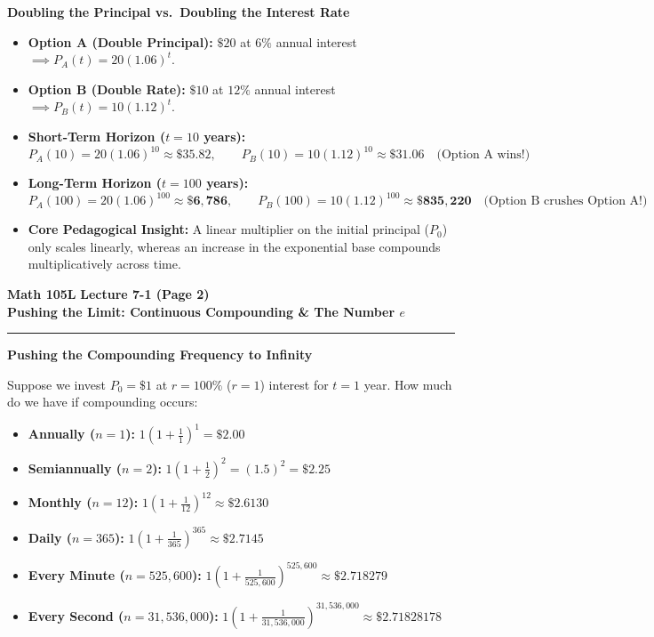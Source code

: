 \documentclass[10.5pt]{article}
\begin{document}
\vspace{0.02in}

\textbf{\large Doubling the Principal vs.\ Doubling the Interest Rate}

\begin{itemize}[leftmargin=1.2em, topsep=1pt, itemsep=2pt]
  \item \textbf{Option A (Double Principal):} $\$20$ at $6\%$ annual interest $\implies P_A(t) = 20(1.06)^t$.
  \item \textbf{Option B (Double Rate):} $\$10$ at $12\%$ annual interest $\implies P_B(t) = 10(1.12)^t$.
  \item \textbf{Short-Term Horizon ($t = 10$ years):}
  \[
    P_A(10) = 20(1.06)^{10} \approx \mathbf{\$35.82}, \qquad P_B(10) = 10(1.12)^{10} \approx \mathbf{\$31.06} \quad \text{(Option A wins!)}
  \]
  \item \textbf{Long-Term Horizon ($t = 100$ years):}
  \[
    P_A(100) = 20(1.06)^{100} \approx \mathbf{\$6,786}, \qquad P_B(100) = 10(1.12)^{100} \approx \mathbf{\$835,220} \quad \text{(Option B crushes Option A!)}
  \]
  \item \textbf{Core Pedagogical Insight:} A linear multiplier on the initial principal ($P_0$) only scales linearly, whereas an increase in the exponential base compounds multiplicatively across time.
\end{itemize}

\newpage

\noindent \textbf{\large Math 105L} \hfill \textbf{\large Lecture 7-1 (Page 2)}\\[1pt]
{\textbf{\Large Pushing the Limit: Continuous Compounding \& The Number $e$}}\\[-5pt]
\rule{\textwidth}{1.2pt}

\vspace{0.03in}

\textbf{\large Pushing the Compounding Frequency to Infinity}

Suppose we invest $P_0 = \$1$ at $r = 100\%$ ($r = 1$) interest for $t = 1$ year. How much do we have if compounding occurs:
\begin{itemize}[leftmargin=1.2em, topsep=1pt, itemsep=2pt]
  \item \textbf{Annually ($n=1$):} $1\left(1 + \frac{1}{1}\right)^1 = \$2.00$
  \item \textbf{Semiannually ($n=2$):} $1\left(1 + \frac{1}{2}\right)^2 = (1.5)^2 = \$2.25$
  \item \textbf{Monthly ($n=12$):} $1\left(1 + \frac{1}{12}\right)^{12} \approx \mathbf{\$2.6130}$
  \item \textbf{Daily ($n=365$):} $1\left(1 + \frac{1}{365}\right)^{365} \approx \mathbf{\$2.7145}$
  \item \textbf{Every Minute ($n=525,600$):} $1\left(1 + \frac{1}{525,600}\right)^{525,600} \approx \mathbf{\$2.718279}$
  \item \textbf{Every Second ($n=31,536,000$):} $1\left(1 + \frac{1}{31,536,000}\right)^{31,536,000} \approx \mathbf{\$2.71828178}$
\end{itemize}
\end{document}
